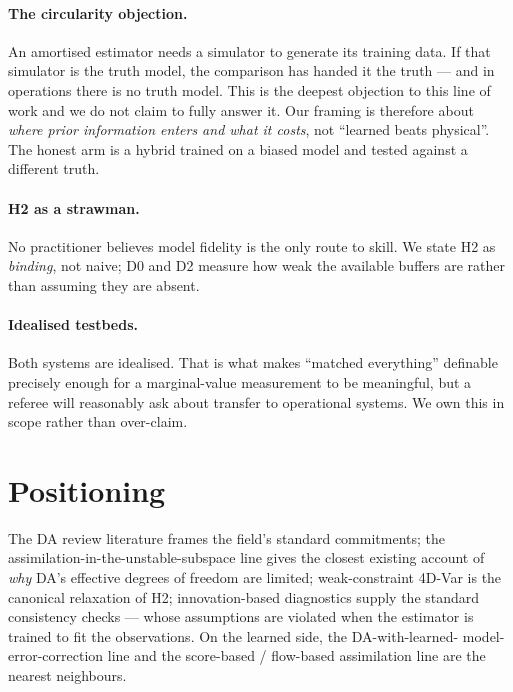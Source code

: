 \paragraph{The circularity objection.}
An amortised estimator needs a simulator to generate its training data. If that
simulator is the truth model, the comparison has handed it the truth --- and in
operations there is no truth model. This is the deepest objection to this line of
work and we do not claim to fully answer it. Our framing is therefore about
\emph{where prior information enters and what it costs}, not ``learned beats
physical''. The honest arm is a hybrid trained on a biased model and tested
against a different truth.

\paragraph{H2 as a strawman.}
No practitioner believes model fidelity is the only route to skill. We state H2
as \emph{binding}, not naive; D0 and D2 measure how weak the available buffers
are rather than assuming they are absent.

\paragraph{Idealised testbeds.}
Both systems are idealised. That is what makes ``matched everything'' definable
precisely enough for a marginal-value measurement to be meaningful, but a
referee will reasonably ask about transfer to operational systems. We own this
in scope rather than over-claim.

\section{Positioning}
\label{sec:positioning}


The DA review literature frames the field's standard commitments; the
assimilation-in-the-unstable-subspace line gives the closest existing account of
\emph{why} DA's effective degrees of freedom are limited; weak-constraint 4D-Var
is the canonical relaxation of H2; innovation-based diagnostics supply the
standard consistency checks --- whose assumptions are violated when the estimator
is trained to fit the observations. On the learned side, the DA-with-learned-
model-error-correction line and the score-based / flow-based assimilation line
are the nearest neighbours.

